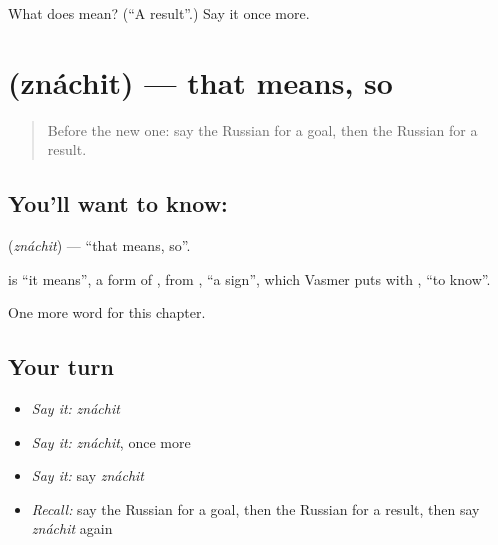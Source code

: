 \begin{tcolorbox}[breakable,colback=teal!4,colframe=teal!35!black,title={Before you move on}]
What does  mean? (\textquotedblleft{}A result\textquotedblright{}.) Say it once more.
\end{tcolorbox}
\section[\texorpdfstring{\ru{значит} (znáchit)}{значит (znáchit)}]{ (znáchit) — that means, so}

\label{lesson:RU-C185-znachit}



\begin{quote}
Before the new one: say the Russian for a goal, then the Russian for a result.
\end{quote}

\subsection*{You'll want to know: }
\textbf{} (\emph{znáchit}) — \textquotedblleft{}that means, so\textquotedblright{}.

\begin{cousinweb}
\textbf{} is \textquotedblleft{}it means\textquotedblright{}, a form of \emph{}, from \emph{}, \textquotedblleft{}a sign\textquotedblright{}, which Vasmer puts with \emph{}, \textquotedblleft{}to know\textquotedblright{}.
\end{cousinweb}

\begin{grammarlens}[title={What you've built}]
One more word for this chapter.
\end{grammarlens}

\subsection*{Your turn}
\begin{itemize}
\raggedright
  \item \emph{Say it:} \emph{znáchit}
  \item \emph{Say it:} \emph{znáchit}, once more
  \item \emph{Say it:} say \emph{znáchit}
  \item \emph{Recall:} say the Russian for a goal, then the Russian for a result, then say \emph{znáchit} again
\end{itemize}

